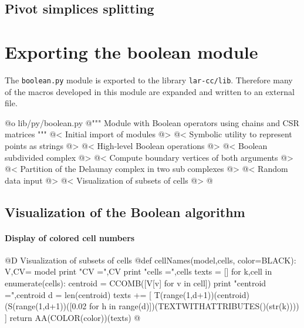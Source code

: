 \documentclass[11pt,oneside]{article}	%
\begin{document}
\subsection{Pivot simplices splitting}
\section{Exporting the boolean module}

The \texttt{boolean.py} module is exported to the library \texttt{lar-cc/lib}. Therefore many of the macros developed in this module are expanded and written to an external file.

@o lib/py/boolean.py
@{""" Module with Boolean operators using chains and CSR matrices """
@< Initial import of modules @>
@< Symbolic utility to represent points as strings @>
@< High-level Boolean operations @>
@< Boolean subdivided complex @>
@< Compute boundary vertices of both arguments @>
@< Partition of the Delaunay complex in two sub complexes @>
@< Random data input @>
@< Visualization of subsets of cells @>
@}

\subsection{Visualization of the Boolean algorithm}

\paragraph{Display of colored cell numbers}

@D Visualization of subsets of cells
@{def cellNames(model,cells, color=BLACK):
	V,CV= model
	print "\n CV =",CV
	print "\n cells =",cells
	texts = []
	for k,cell in enumerate(cells):
		centroid = CCOMB([V[v] for v in cell])
		print "centroid =",centroid
		d = len(centroid)
		texts += [ T(range(1,d+1))(centroid)(S(range(1,d+1))([0.02 
						for h in range(d)])(TEXTWITHATTRIBUTES()(str(k)))) ]
	return AA(COLOR(color))(texts)
@}
\end{document}
